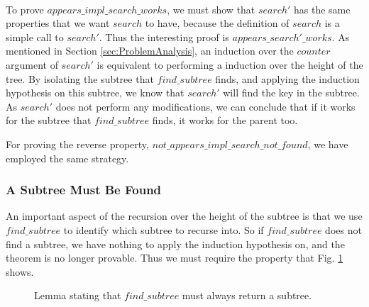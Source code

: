 \paragraph{}
To prove $appears\_impl\_search\_works$, we must show that $search'$ has the same properties that we want $search$ to have, because the definition of $search$ is a simple call to $search'$. Thus the interesting proof is $appears\_search'\_works$. As mentioned in Section \ref{sec:ProblemAnalysis}, an induction over the $counter$ argument of $search'$ is equivalent to performing a induction over the height of the tree. By isolating the subtree that $find\_subtree$ finds, and applying the induction hypothesis on this subtree, we know that $search'$ will find the key in the subtree. As $search'$ does not perform any modifications, we can conclude that if it works for the subtree that $find\_subtree$ finds, it works for the parent too. 

For proving the reverse property, $not\_appears\_impl\_search\_not\_found$, we have employed the same strategy.

\subsubsection{A Subtree Must Be Found}
An important aspect of the recursion over the height of the subtree is that we use $find\_subtree$ to identify which subtree to recurse into. So if $find\_subtree$ does not find a subtree, we have nothing to apply the induction hypothesis on, and the theorem is no longer provable. Thus we must require the property that Fig. \ref{fig:find_must_find} shows.

\begin{figure}
  
  \label{fig:find_must_find}
  \caption{Lemma stating that $find\_subtree$ must always return a subtree.}
\end{figure}

